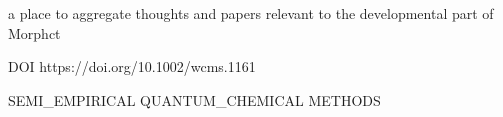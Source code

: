 a place to aggregate thoughts and papers relevant to the developmental part of Morphct


DOI https://doi.org/10.1002/wcms.1161

        SEMI_EMPIRICAL QUANTUM_CHEMICAL METHODS

    
